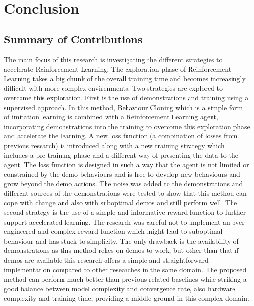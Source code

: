 \section{Conclusion}

\subsection{Summary of Contributions}

The main focus of this research is investigating the different strategies to accelerate Reinforcement Learning. The exploration phase of Reinforcement Learning takes a big chunk of the overall training time and becomes increasingly difficult with more complex environments. Two strategies are explored to overcome this exploration. First is the use of demonstrations and training using a supervised approach. In this method, Behaviour Cloning which is a simple form of imitation learning is combined with a Reinforcement Learning agent, incorporating demonstrations into the training to overcome this exploration phase and accelerate the learning. A new loss function (a combination of losses from previous research)
\cite{nair2018overcoming} \cite{goecks2020integrating} is introduced along with a new training strategy which includes a pre-training phase and a different way of presenting the data to the agent. The loss function is designed in such a way that the agent is not limited or constrained by the demo behaviours and is free to develop new behaviours and grow beyond the demo actions. The noise was added to the demonstrations and different sources of the demonstrations were tested to show that this method can cope with change and also with suboptimal demos and still perform well. The second strategy is the use of a simple and informative reward function to further support accelerated learning. The research was careful not to implement an over-engineered and complex reward function which might lead to suboptimal behaviour and has stuck to simplicity. The only drawback is the availability of demonstrations as this method relies on demos to work, but other than that if demos are available this research offers a simple and straightforward implementation compared to other researches in the same domain. The proposed method can perform much better than previous related baselines while striking a good balance between model complexity and convergence rate, also hardware complexity and training time, providing a middle ground in this complex domain. \\


